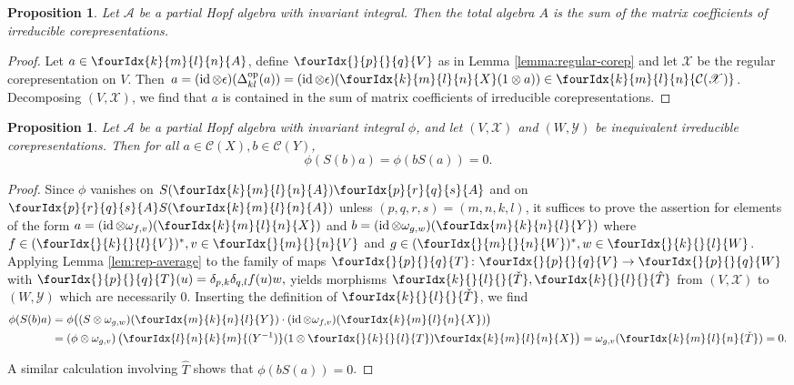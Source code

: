 \documentclass[10pt]{article}
\DeclareMathOperator{\id}{id}
\DeclareMathOperator{\op}{\mathrm{op}}
\newcommand{\dual}[1]{#1^{*}}
\newcommand{\Gr}[5]{\fourIdx{#2}{#4}{#3}{#5}{#1}}%
\newcommand{\Gru}[3]{\Gr{#1}{}{}{#2}{#3}}
\newcommand{\Grd}[3]{\Gr{#1}{#2}{#3}{}{}}
\newtheorem{Prop}[Theorem]{Proposition}
\theoremstyle{definition}
\numberwithin{equation}{section}
\begin{document}
\begin{Prop} \label{prop:rep-weak-pw} Let $\mathscr{A}$ be a partial
  Hopf algebra with invariant integral. Then the total algebra $A$ is the sum
  of the matrix coefficients of irreducible corepresentations.
\end{Prop}
\begin{proof} 
  Let $a \in \Gr{A}{k}{l}{m}{n}$, define $\Gru{V}{p}{q}$ as in
  Lemma \ref{lemma:regular-corep} and let $\mathscr{X}$ be the regular
  corepresentation on $V$. Then
  $a = (\id \otimes \epsilon)(\Delta^{\op}_{kl}(a)) =
    (\id \otimes \epsilon)(\Gr{X}{k}{l}{m}{n}(1 \otimes a)) \in
    \Gr{\mathcal{C}(\mathscr{X})}{k}{l}{m}{n}$.
  Decomposing $(V,\mathscr{X})$, we find that
  $a$ is contained in the sum of matrix coefficients of irreducible  corepresentations.
\end{proof}

\begin{Prop} \label{prop:rep-orthogonality-1} Let $\mathscr{A}$ be a
  partial Hopf algebra with invariant integral $\phi$, and let
  $(V,\mathscr{X})$ and
  $(W,\mathscr{Y})$ be inequivalent irreducible corepresentations.  Then  for all
  $a\in \mathcal{C}(X), b \in \mathcal{C}(Y)$,
  \[\phi(S(b)a) = \phi(bS(a))=0.\]
\end{Prop}
\begin{proof}
Since $\phi$ vanishes on $S(\Gr{A}{k}{l}{m}{n})\Gr{A}{p}{q}{r}{s}$ and
on $\Gr{A}{p}{q}{r}{s}S(\Gr{A}{k}{l}{m}{n})$ unless
$(p,q,r,s) = (m,n,k,l)$, it suffices to prove the assertion for  elements of the form $
  a=(\id \otimes \omega_{f,v})(\Gr{X}{k}{l}{m}{n})$ and  $b =(\id \otimes \omega_{g,w})(\Gr{Y}{m}{n}{k}{l})$
where $f\in \dual{(\Gru{V}{k}{l})}, v \in \Gru{V}{m}{n}$ and $g \in
\dual{(\Gru{W}{m}{n})}, w \in \Gru{W}{k}{l}$.  Applying Lemma
\ref{lem:rep-average} to the family of maps $\Gru{T}{p}{q} \colon \Gru{V}{p}{q} \to \Gru{W}{p}{q}$ with $\Gru{T}{p}{q}(u) =  \delta_{p,k}\delta_{q,l}  f(u)w,$
  yields morphisms $\Grd{\check{T}}{k}{l},\Grd{\hat{T}}{k}{l}$ from $(V,\mathscr{X})$ to
  $(W,\mathscr{Y})$ which are necessarily $0$. Inserting the
  definition of $\Grd{\check{T}}{k}{l}$, we find
  \begin{align*}
    \phi(S(b)a) &= \phi\big((S \otimes
    \omega_{g,w})(\Gr{Y}{m}{n}{k}{l}) \cdot (\id \otimes
    \omega_{f,v})(\Gr{X}{k}{l}{m}{n})\big) \\ &= (\phi \otimes \omega_{g,v})\left(\Gr{(Y^{-1})}{l}{k}{n}{m}(1 \otimes
      \Gru{T}{k}{l} )     \Gr{X}{k}{l}{m}{n}\right) 
    = \omega_{g,v}( \Gr{\check{T}}{k}{l}{m}{n}) = 0.
  \end{align*}
  
  A similar calculation involving $\hat{T}$ shows that
  $\phi(bS(a))=0$.  
\end{proof}
\end{document}
